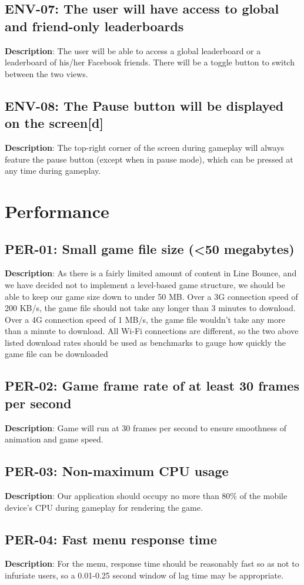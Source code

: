 \subsection{ENV-07: The user will have access to global and friend-only leaderboards}
\textbf{Description}: The user will be able to access a global leaderboard
or a leaderboard of his/her Facebook friends. There will be a toggle
button to switch between the two views.
\subsection{ENV-08: The Pause button will be displayed on the screen{[}d{]}}
\textbf{Description}: The top-right corner of the screen during gameplay will
always feature the pause button (except when in pause mode), which
can be pressed at any time during gameplay.
\section{Performance}
\subsection{PER-01: Small game file size (<50 megabytes)}
\textbf{Description}: As there is a fairly limited amount of content in Line
Bounce, and we have decided not to implement a level-based game structure,
we should be able to keep our game size down to under 50 MB. Over
a 3G connection speed of 200 KB/s, the game file should not take any
longer than 3 minutes to download. Over a 4G connection speed of 1
MB/s, the game file wouldn\textquoteright{}t take any more than a
minute to download. All Wi-Fi connections are different, so the two
above listed download rates should be used as benchmarks to gauge
how quickly the game file can be downloaded
\subsection{PER-02: Game frame rate of at least 30 frames per second}
\textbf{Description}: Game will run at 30 frames per second to ensure smoothness
of animation and game speed.
\subsection{PER-03: Non-maximum CPU usage}
\textbf{Description}: Our application should occupy no more than 80\% of the
mobile device\textquoteright{}s CPU during gameplay for rendering
the game. 
\subsection{PER-04: Fast menu response time}
\textbf{Description}: For the menu, response time should be reasonably fast
so as not to infuriate users, so a 0.01-0.25 second window of lag
time may be appropriate.
